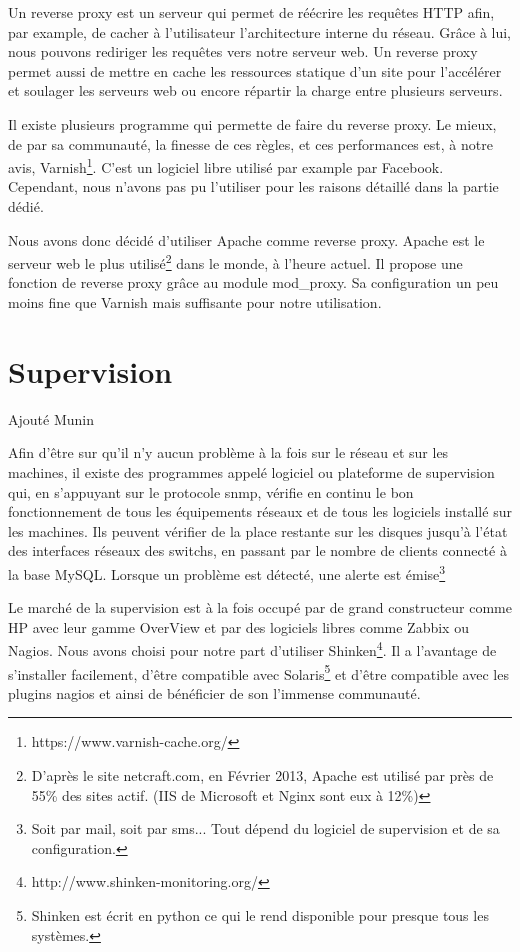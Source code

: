 \documentclass[a4paper,oneside]{report}
\begin{document}
Un reverse proxy est un serveur qui permet de réécrire les requêtes HTTP afin, par example, de cacher à l'utilisateur l'architecture interne du réseau.
Grâce à lui, nous pouvons rediriger les requêtes vers notre serveur web.
Un reverse proxy permet aussi de mettre en cache les ressources statique d'un site pour l'accélérer et soulager les serveurs web ou encore répartir la charge entre plusieurs serveurs.

Il existe plusieurs programme qui permette de faire du reverse proxy.
Le mieux, de par sa communauté, la finesse de ces règles, et ces performances est, à notre avis, Varnish\footnote{https://www.varnish-cache.org/}.
C'est un logiciel libre utilisé par example par Facebook. Cependant, nous n'avons pas pu l'utiliser pour les raisons détaillé dans la partie dédié.

Nous avons donc décidé d'utiliser Apache comme reverse proxy. Apache est le serveur web le plus utilisé\footnote{D'après le site netcraft.com, en Février 2013, Apache est utilisé par près de 55\% des sites actif. (IIS de Microsoft et Nginx sont eux à 12\%)} dans le monde, à l'heure actuel.
Il propose une fonction de reverse proxy grâce au module mod\_proxy. Sa configuration un peu moins fine que Varnish mais suffisante pour notre utilisation.

\section{Supervision}

Ajouté Munin

Afin d'être sur qu'il n'y aucun problème à la fois sur le réseau et sur les machines, il existe des programmes appelé logiciel ou plateforme de supervision qui, en s'appuyant sur le protocole snmp, vérifie en continu le bon fonctionnement de tous les équipements réseaux et de tous les logiciels installé sur les machines.
Ils peuvent vérifier de la place restante sur les disques jusqu'à l'état des interfaces réseaux des switchs, en passant par le nombre de clients connecté à la base MySQL.
Lorsque un problème est détecté, une alerte est émise\footnote{Soit par mail, soit par sms... Tout dépend du logiciel de supervision et de sa configuration.}

Le marché de la supervision est à la fois occupé par de grand constructeur comme HP avec leur gamme OverView et par des logiciels libres comme Zabbix ou Nagios.
Nous avons choisi pour notre part d'utiliser Shinken\footnote{http://www.shinken-monitoring.org/}.
Il a l'avantage de s'installer facilement, d'être compatible avec Solaris\footnote{Shinken est écrit en python ce qui le rend disponible pour presque tous les systèmes.} et d'être compatible avec les plugins nagios et ainsi de bénéficier de son l'immense communauté.
\end{document}
